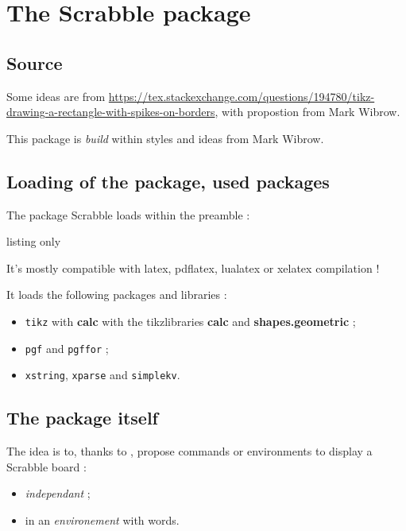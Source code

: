 \documentclass{article}
\newcommand\Cle[1]{{\bfseries\sffamily\textlangle #1\textrangle}}
\begin{document}
\section{The Scrabble package}

\subsection{Source}

Some ideas are from \url{https://tex.stackexchange.com/questions/194780/tikz-drawing-a-rectangle-with-spikes-on-borders}, with propostion from Mark Wibrow.

\smallskip

This package is \textit{build} within styles and ideas from Mark Wibrow.

\subsection{Loading of the package, used packages}

The package \textsf{Scrabble} loads within the preamble :

\begin{PresentationCode}{listing only}
\usepackage{Scrabble}
\end{PresentationCode}

It's mostly compatible with \textsf{latex}, \textsf{pdflatex}, \textsf{lualatex} or \textsf{xelatex} compilation !

\medskip

It loads the following packages and libraries :

\begin{itemize}
	\item \texttt{tikz} with \Cle{calc} with the tikzlibraries \Cle{calc} and \Cle{shapes.geometric} ;
	\item \texttt{pgf} and \texttt{pgffor} ;
	\item \texttt{xstring}, \texttt{xparse} and \texttt{simplekv}.
\end{itemize}

\subsection{The package itself}

The idea is to, thanks to \TikZ, propose commands or environments to display a Scrabble\texttrademark{} board :

\begin{itemize}
	\item \textit{independant} ;
	\item in an \textit{environement} with words.
\end{itemize}
\end{document}
